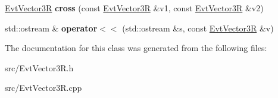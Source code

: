\begin{DoxyCompactItemize}
\item 
\hypertarget{class_evt_vector3_r_a9f24484519d59df7e930f9530315fce9}{}\hyperlink{class_evt_vector3_r}{Evt\+Vector3\+R} {\bfseries cross} (const \hyperlink{class_evt_vector3_r}{Evt\+Vector3\+R} \&v1, const \hyperlink{class_evt_vector3_r}{Evt\+Vector3\+R} \&v2)\label{class_evt_vector3_r_a9f24484519d59df7e930f9530315fce9}

\item 
\hypertarget{class_evt_vector3_r_aa05db12d53776ab696b6311d929346d1}{}std\+::ostream \& {\bfseries operator$<$$<$} (std\+::ostream \&s, const \hyperlink{class_evt_vector3_r}{Evt\+Vector3\+R} \&v)\label{class_evt_vector3_r_aa05db12d53776ab696b6311d929346d1}

\end{DoxyCompactItemize}


The documentation for this class was generated from the following files\+:\begin{DoxyCompactItemize}
\item 
src/Evt\+Vector3\+R.\+h\item 
src/Evt\+Vector3\+R.\+cpp\end{DoxyCompactItemize}

